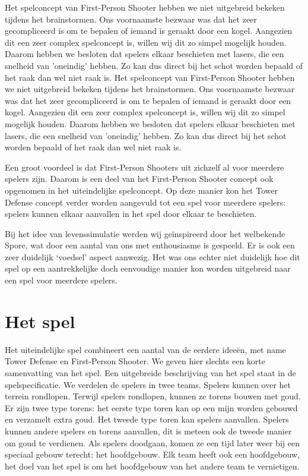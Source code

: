 Het spelconcept van First-Person Shooter hebben we niet uitgebreid bekeken tijdens het brainstormen. Ons voornaamste bezwaar was dat het zeer gecompliceerd is om te bepalen of iemand is geraakt door een kogel. Aangezien dit een zeer complex spelconcept is, willen wij dit zo simpel mogelijk houden. Daarom hebben we besloten dat spelers elkaar beschieten met lasers, die een snelheid van 'oneindig' hebben. Zo kan dus direct bij het schot worden bepaald of het raak dan wel niet raak is. 
Het spelconcept van First-Person Shooter hebben we niet uitgebreid bekeken tijdens het brainstormen. Ons voornaamste bezwaar was dat het zeer gecompliceerd is om te bepalen of iemand is geraakt door een kogel. Aangezien dit een zeer complex spelconcept is, willen wij dit zo simpel mogelijk houden. Daarom hebben we besloten dat spelers elkaar beschieten met lasers, die een snelheid van 'oneindig' hebben. Zo kan dus direct bij het schot worden bepaald of het raak dan wel niet raak is.

Een groot voordeel is dat First-Person Shooters uit zichzelf al voor meerdere spelers zijn. Daarom is een deel van het First-Person Shooter concept ook opgenomen in het uiteindelijke spelconcept. Op deze manier kon het Tower Defense concept verder worden aangevuld tot een spel voor meerdere spelers: spelers kunnen elkaar aanvallen in het spel door elkaar te beschieten.

Bij het idee van levenssimulatie werden wij ge\"inspireerd door het welbekende Spore, wat door een aantal van ons met enthousiasme is gespeeld. Er is ook een zeer duidelijk `voedsel' aspect aanwezig. Het was ons echter niet duidelijk hoe dit spel op een aantrekkelijke doch eenvoudige manier kon worden uitgebreid naar een spel voor meerdere spelers.

\section{Het spel}
Het uiteindelijke spel combineert een aantal van de eerdere idee\"en, met name Tower Defense en First-Person Shooter. We geven hier slechts een korte samenvatting van het spel. Een uitgebreide beschrijving van het spel staat in de spelspecificatie. We verdelen de spelers in twee teams. Spelers kunnen over het terrein rondlopen. Terwijl spelers rondlopen, kunnen ze torens bouwen met goud. Er zijn twee type torens: het eerste type toren kan op een mijn worden gebouwd en verzamelt extra goud. Het tweede type toren kan spelers aanvallen. Spelers kunnen andere spelers en torens aanvallen, dit is meteen ook de tweede manier om goud te verdienen. Als spelers doodgaan, komen ze een tijd later weer bij een speciaal gebouw terecht: het hoofdgebouw. Elk team heeft ook een hoofdgebouw, het doel van het spel is om het hoofdgebouw van het andere team te vernietigen.

